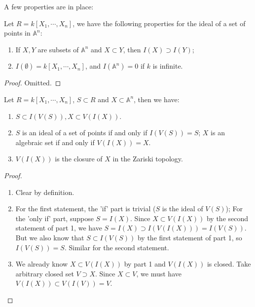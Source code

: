\documentclass{note-eng}
\begin{document}
A few properties are in place:

\begin{proposition}\label{prop:affine-ideal-properties}
    Let $R = k[X_1, \cdots, X_n]$, we have the following properties for the ideal of a set of points in $\mathbb{A}^n$:
    \begin{enumerate}
        \item If $X, Y$ are subsets of $\mathbb{A}^n$ and $X \subset Y$, then $I(X) \supset I(Y)$;
        \item $I(\emptyset) = k[X_1, \cdots, X_n]$, and $I(\mathbb{A}^n) = 0$ if $k$ is infinite.
    \end{enumerate}
\end{proposition}

\begin{proof}
    Omitted.
\end{proof}

\begin{proposition}\label{prop:affine-VI-corresp}
    Let $R = k[X_1, \cdots, X_n]$, $S \subset R$ and $X \subset \mathbb{A}^n$, then we have:
    \begin{enumerate}
        \item $S \subset I(V(S)), X \subset V(I(X))$.
        \item $S$ is an ideal of a set of points if and only if $I(V(S)) = S$; $X$ is an algebraic set if and only if $V(I(X)) = X$.
        \item $V(I(X))$ is the closure of $X$ in the Zariski topology.
    \end{enumerate}
\end{proposition}

\begin{proof}
    \begin{enumerate}
        \item Clear by definition.
        \item For the first statement, the 'if' part is trivial ($S$ is the ideal of $V(S)$); For the 'only if' part, suppose $S = I(X)$. Since $X \subset V(I(X))$ by the second statement of part 1, we have $S = I(X) \supset I(V(I(X))) = I(V(S))$. But we also know that $S \subset I(V(S))$ by the first statement of part 1, so $I(V(S)) = S$. Similar for the second statement.
        \item We already know $X \subset V(I(X))$ by part 1 and $V(I(X))$ is closed. Take arbitrary closed set $V \supset X$. Since $X \subset V$, we must have $V(I(X)) \subset V(I(V)) = V$.
    \end{enumerate}
\end{proof}
\end{document}
